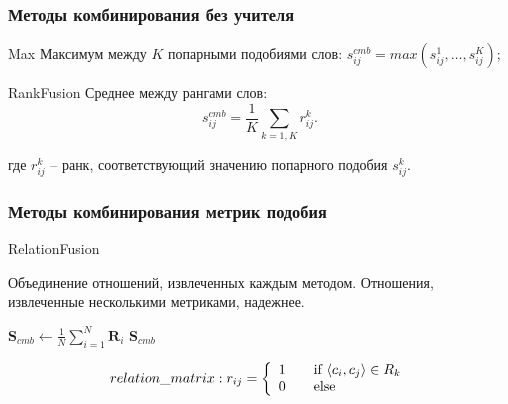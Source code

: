 \begin{frame}
\frametitle{Методы комбинирования без учителя}

\begin{block}{Max}
Максимум между $K$ попарными подобиями слов:
$s_{ij}^{cmb}= max(s_{ij}^1,\ldots,s_{ij}^K);$
\end{block}

\begin{block}{RankFusion}
Среднее между рангами слов:
$$s_{ij}^{cmb}= \frac{1}{K}\sum_{k=1,K} r_{ij}^k.$$

где  $r^k_{ij}$ -- ранк, соответствующий значению попарного подобия $s^k_{ij}$.
\end{block}


\end{frame}






\begin{frame}
\frametitle{Методы комбинирования метрик подобия}

\begin{block}{RelationFusion}

Объединение отношений, извлеченных каждым методом. Отношения, извлеченные несколькими метриками, надежнее.


\begin{algorithm}[H]
{}

$\mathbf{S}_{cmb} \leftarrow \frac{1}{N} \sum_{i=1}^N \mathbf{R}_i$ \;
\Return $\mathbf{S}_{cmb}$ \;
\label{rfusion}
\end{algorithm}

$$
relation\_matrix: r_{ij} = \left\{ 
  \begin{array}{l l}
    1 & \quad \text{if } \langle c_i, c_j \rangle \in R_k \\
    0 & \quad \text{else}\\
  \end{array} \right.
$$

\end{block}

\end{frame}






